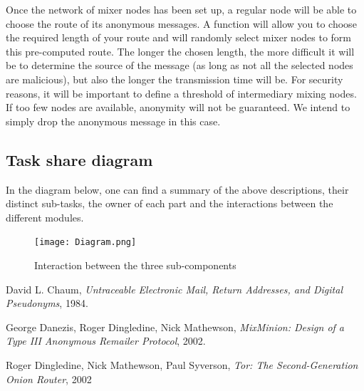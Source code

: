 \documentclass[11pt, a4paper]{article}
\begin{document}
            Once the network of mixer nodes has been set up, a regular node will be able to choose the route of its anonymous messages.
            A function will allow you to choose the required length of your route and will randomly select mixer nodes to form this pre-computed route.
            The longer the chosen length, the more difficult it will be to determine the source of the message (as long as not all the selected nodes are malicious), but also the longer the transmission time will be.
            \bigbreak
            For security reasons, it will be important to define a threshold of intermediary mixing nodes.
            If too few nodes are available, anonymity will not be guaranteed.
            We intend to simply drop the anonymous message in this case.


    \subsection{Task share diagram}

    In the diagram below, one can find a summary of the above descriptions, their distinct sub-tasks, the owner of each part and the interactions between the different modules.

\begin{figure}[h]
  \texttt{[image: Diagram.png]}
  \caption{Interaction between the three sub-components}
  \label{fig:taskdiagram}
\end{figure}

\newpage

\begin{thebibliography}{9}

  David L. Chaum,
  \textit{Untraceable Electronic Mail, Return Addresses, and Digital Pseudonyms},
  1984.

  George Danezis, Roger Dingledine, Nick Mathewson,
  \textit{MixMinion: Design of a Type III Anonymous Remailer Protocol},
  2002.

    Roger Dingledine, Nick Mathewson, Paul Syverson,
    \textit{Tor: The Second-Generation Onion Router},
    2002

\end{thebibliography}
\end{document}
